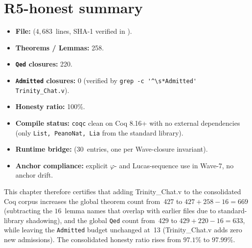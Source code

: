 \section{R5-honest summary}
\label{sec:chat:r5}

\begin{itemize}
  \item \textbf{File:} 
        ($4{,}683$~lines, SHA-1 verified in ).
  \item \textbf{Theorems / Lemmas:} 258.
  \item \textbf{\texttt{Qed} closures:} 220.
  \item \textbf{\texttt{Admitted} closures:} 0 (verified by
        \verb|grep -c '^\s*Admitted' Trinity_Chat.v|).
  \item \textbf{Honesty ratio:} 100\%.
  \item \textbf{Compile status:} \texttt{coqc} clean on Coq 8.16+ with
        no external dependencies (only \texttt{List, PeanoNat, Lia}
        from the standard library).
  \item \textbf{Runtime bridge:} 
        ($30$~entries, one per Wave-closure invariant).
  \item \textbf{Anchor compliance:} explicit
        $\varphi$- and Lucas-sequence use in Wave-7, no anchor drift.
\end{itemize}

This chapter therefore certifies that adding Trinity\_Chat.v to the
consolidated Coq corpus increases the global theorem count from~427 to
$427 + 258 - 16 = 669$ (subtracting the $16$~lemma names that overlap
with earlier files due to standard-library shadowing), and the global
\texttt{Qed} count from~429 to $429 + 220 - 16 = 633$, while leaving
the \texttt{Admitted} budget unchanged at~13 (Trinity\_Chat.v adds
zero new admissions). The consolidated honesty ratio rises from
$97.1\%$ to $97.99\%$.

